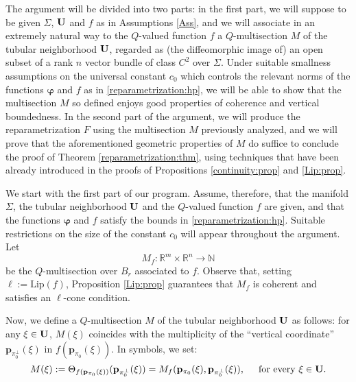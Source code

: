 \documentclass[a4paper,11pt,reqno]{amsart}
\theoremstyle{definition}
\numberwithin{equation}{section}
\numberwithin{subsection}{section}
\newcommand{\N}{\mathbb{N}}
\newcommand{\R}{\mathbb{R}}
\newcommand{\Lip}{\mathrm{Lip}}
\newcommand{\bphi}{\boldsymbol{\varphi}}
\newcommand{\p}{\mathbf{p}}
\begin{document}

The argument will be divided into two parts: in the first part, we will suppose to be given $\Sigma$, ${\bf U}$ and $f$ as in Assumptions \ref{Ass}, and we will associate in an extremely natural way to the $Q$-valued function $f$ a $Q$-multisection $M$ of the tubular neighborhood ${\bf U}$, regarded as (the diffeomorphic image of) an open subset of a rank $n$ vector bundle of class $C^2$ over $\Sigma$. Under suitable smallness assumptions on the universal constant $c_{0}$ which controls the relevant norms of the functions $\bphi$ and $f$ as in \eqref{reparametrization:hp}, we will be able to show that the multisection $M$ so defined enjoys good properties of coherence and vertical boundedness. In the second part of the argument, we will produce the reparametrization $F$ using the multisection $M$ previously analyzed, and we will prove that the aforementioned geometric properties of $M$ do suffice to conclude the proof of Theorem \ref{reparametrization:thm}, using techniques that have been already introduced in the proofs of Propositions \ref{continuity:prop} and \ref{Lip:prop}.

We start with the first part of our program. Assume, therefore, that the manifold $\Sigma$, the tubular neighborhood ${\bf U}$ and the $Q$-valued function $f$ are given, and that the functions $\bphi$ and $f$ satisfy the bounds in \eqref{reparametrization:hp}. Suitable restrictions on the size of the constant $c_{0}$ will appear throughout the argument. Let
\begin{equation} \label{multi_f}
M_{f} \colon \R^{m} \times \R^{n} \to \N
\end{equation}
be the $Q$-multisection over $B_{r}$ associated to $f$. Observe that, setting $\ell := \Lip(f)$, Proposition \ref{Lip:prop} guarantees that $M_{f}$ is coherent and satisfies an $\ell$-cone condition. 

Now, we define a $Q$-multisection $M$ of the tubular neighborhood ${\bf U}$ as follows: for any $\xi \in {\bf U}$, $M(\xi)$ coincides with the multiplicity of the ``vertical coordinate'' $\p_{\pi_{0}^{\perp}}(\xi)$ in $f(\p_{\pi_{0}}(\xi))$. In symbols, we set:
\begin{equation} \label{reparametrized_multi}
M(\xi) := \Theta_{f(\p_{\pi_0}(\xi))}(\p_{\pi_{0}^{\perp}}(\xi)) = M_{f}(\p_{\pi_0}(\xi), \p_{\pi_0^\perp}(\xi)), \hspace{0.5cm} \mbox{for every } \xi \in {\bf U}.  
\end{equation}
\end{document}
